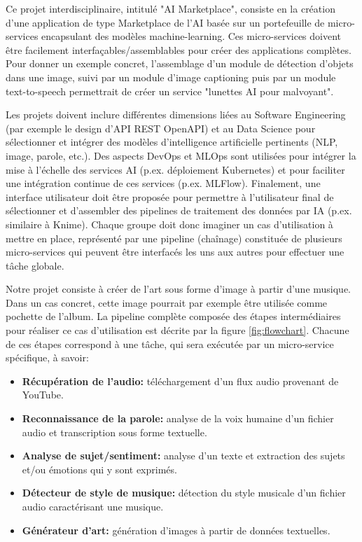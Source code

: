 Ce projet interdisciplinaire, intitulé "AI Marketplace", consiste en la création d'une application de type Marketplace de l'AI basée sur un portefeuille de micro-services encapsulant des modèles machine-learning. Ces micro-services doivent être facilement interfaçables/assemblables pour créer des applications complètes. Pour donner un exemple concret, l’assemblage d’un module de détection d’objets dans une image, suivi par un module d'image captioning puis par un module text-to-speech permettrait de créer un service "lunettes AI pour malvoyant". 

Les projets doivent inclure différentes dimensions liées au Software Engineering (par exemple le design d'API REST OpenAPI) et au Data Science pour sélectionner et intégrer des modèles d'intelligence artificielle pertinents (NLP, image, parole, etc.). Des aspects DevOps et MLOps sont utilisées pour intégrer la mise à l’échelle des services AI (p.ex. déploiement Kubernetes) et pour faciliter une intégration continue de ces services (p.ex. MLFlow). Finalement, une interface utilisateur doit être proposée pour permettre à l’utilisateur final de sélectionner et d’assembler des pipelines de traitement des données par IA (p.ex. similaire à Knime). Chaque groupe doit donc imaginer un cas d'utilisation à mettre en place, représenté par une pipeline (chaînage) constituée de plusieurs micro-services qui peuvent être interfacés les uns aux autres pour effectuer une tâche globale. 

Notre projet consiste à créer de l'art sous forme d'image à partir d'une musique. Dans un cas concret, cette image pourrait par exemple être utilisée comme pochette de l'album. La pipeline complète composée des étapes intermédiaires pour réaliser ce cas d'utilisation est décrite par la figure \ref{fig:flowchart}. Chacune de ces étapes correspond à une tâche, qui sera exécutée par un micro-service spécifique, à savoir:

\begin{itemize}
    \item \textbf{Récupération de l'audio:} téléchargement d'un flux audio provenant de YouTube.
    \item \textbf{Reconnaissance de la parole:} analyse de la voix humaine d'un fichier audio et transcription sous forme textuelle.
    \item \textbf{Analyse de sujet/sentiment:} analyse d'un texte et extraction des sujets et/ou émotions qui y sont exprimés.
    \item \textbf{Détecteur de style de musique:} détection du style musicale d'un fichier audio caractérisant une musique.
    \item \textbf{Générateur d'art:} génération d'images à partir de données textuelles.
\end{itemize}

